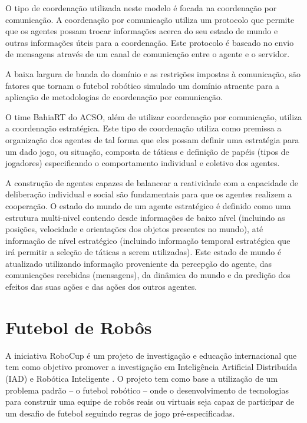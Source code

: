 O tipo de coordenação utilizada neste modelo é focada na coordenação por comunicação. A coordenação por comunicação utiliza um protocolo
que permite que os agentes possam trocar informações acerca do seu estado de mundo e outras informações úteis para a coordenação. Este 
protocolo é baseado no envio de mensagens através de um canal de comunicação entre o agente e o servidor.

A baixa largura de banda do domínio e as restrições impostas à comunicação, são fatores que tornam o futebol robótico simulado um domínio 
atraente para a aplicação de metodologias de coordenação por comunicação.

O time BahiaRT do ACSO, além de utilizar coordenação por comunicação, utiliza a coordenação estratégica. Este tipo de coordenação utiliza 
como premissa a organização dos agentes de tal forma que eles possam definir uma estratégia para um dado jogo, ou situação, composta de 
táticas e definição de papéis (tipos de jogadores) especificando o comportamento individual e coletivo dos agentes.

A construção de agentes capazes de balancear a reatividade com a capacidade de deliberação individual e social são fundamentais 
para que os agentes realizem a cooperação. O estado do mundo de um agente estratégico é definido como uma estrutura multi-nivel
contendo desde informações de baixo nível (incluindo as posições, velocidade e orientações dos objetos presentes no mundo), até 
informação de nível estratégico (incluindo informação temporal estratégica que irá permitir a seleção de táticas a serem utilizadas). 
Este estado de mundo é atualizado utilizando informação proveniente da percepção do agente, das comunicações recebidas (mensagens), da 
dinâmica do mundo e da predição dos efeitos das suas ações e das ações dos outros agentes.

\section{Futebol de Robôs}
\label{sec:futebolderobos}
A iniciativa RoboCup \cite{kitano95} \cite{Kitano97} é um projeto de investigação e educação internacional que tem como objetivo 
promover a investigação em Inteligência Artificial Distribuída (IAD) e Robótica Inteligente \cite{robocup}. O projeto tem como base a 
utilização de um problema padrão – o futebol robótico – onde o desenvolvimento de tecnologias para construir uma equipe de robôs 
reais ou virtuais seja capaz de participar de um desafio de futebol seguindo regras de jogo pré-especificadas.


